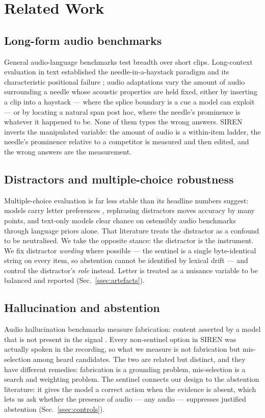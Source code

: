 \documentclass{article}
\newcommand{\bench}{SIREN}
\begin{document}
\section{Related Work}
\label{sec:related}

\subsection{Long-form audio benchmarks}
General audio-language benchmarks \cite{airbench,mmau,audiobench,dynamicsuperb}
test breadth over short clips. Long-context evaluation in text established the
needle-in-a-haystack paradigm \cite{niah,ruler} and its characteristic
positional failure \cite{lostmiddle}; audio adaptations vary the amount of
audio surrounding a needle whose acoustic properties are held fixed, either
by inserting a clip into a haystack --- where the splice boundary is a cue a
model can exploit --- or by locating a natural span post hoc, where the
needle's prominence is whatever it happened to be. None of them types the
wrong answers. \bench{} inverts the manipulated variable: the amount of
audio is a within-item ladder, the needle's prominence relative to a
competitor is measured and then edited, and the wrong answers are the
measurement.

\subsection{Distractors and multiple-choice robustness}
Multiple-choice evaluation is far less stable than its headline numbers
suggest: models carry letter preferences \cite{mcqselectors}, rephrasing
distractors moves accuracy by many points, and text-only models clear chance
on ostensibly audio benchmarks through language priors alone. That
literature treats the distractor as a confound to be neutralised. We take the
opposite stance: the distractor is the instrument. We fix distractor
\emph{wording} where possible --- the sentinel is a single byte-identical
string on every item, so abstention cannot be identified by lexical drift ---
and control the distractor's \emph{role} instead. Letter is treated as a
nuisance variable to be balanced and reported (Sec.~\ref{ssec:artefacts}).

\subsection{Hallucination and abstention}
Audio hallucination benchmarks measure fabrication: content asserted by a
model that is not present in the signal \cite{audiohallu}. Every non-sentinel
option in \bench{} was actually spoken in the recording, so what we measure is
not fabrication but mis-selection among heard candidates. The two are related
but distinct, and they have different remedies: fabrication is a grounding
problem, mis-selection is a search and weighting problem. The sentinel
connects our design to the abstention literature: it gives the model a
correct action when the evidence is absent, which lets us ask whether the
presence of audio --- any audio --- suppresses justified abstention
(Sec.~\ref{ssec:controls}).
\end{document}
